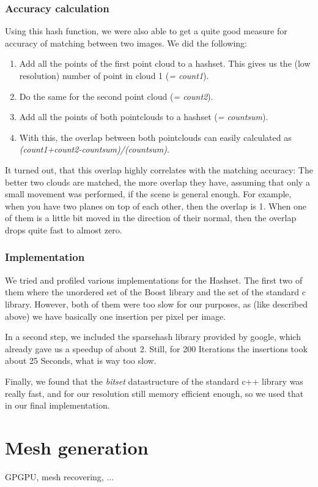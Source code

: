 \documentclass[10pt,twocolumn,letterpaper]{article}
\begin{document}
\subsubsection{Accuracy calculation}
Using this hash function, we were also able to get a quite good measure for accuracy of matching between two images. We did the following:
\begin{enumerate}
\item Add all the points of the first point cloud to a hashset. This gives us the (low resolution) number of point in cloud 1 (\textit{= count1}).
\item Do the same for the second point cloud (\textit{= count2}).
\item Add all the points of both pointclouds to a hashset (\textit{= countsum}).
\item With this, the overlap between both pointclouds can easily calculated as \textit{(count1+count2-countsum)/(countsum)}.
\end{enumerate}
It turned out, that this overlap highly correlates with the matching accuracy: The better two clouds are matched, the more overlap they have, assuming
that only a small movement was performed, if the scene is general enough. For example, when you have two planes on top of each other, then the overlap
is 1. When one of them is a little bit moved in the direction of their normal, then the overlap drops quite fast to almost zero.

\subsubsection{Implementation}
We tried and profiled various implementations for the Hashset. The first two of them where the unordered set of the Boost library and the set of the
standard c library. However, both of them were too slow for our purposes, as (like described above) we have basically one insertion per pixel per image.

In a second step, we included the sparsehash library provided by google, which already gave us a speedup of about 2. Still, for 200 Iterations the
insertions took about 25 Seconds, what is way too slow.

Finally, we found that the \textit{bitset} datastructure of the standard c++ library was really fast, and for our resolution still memory efficient enough,
so we used that in our final implementation.

\section{Mesh generation}
GPGPU, mesh recovering, ...
\end{document}
